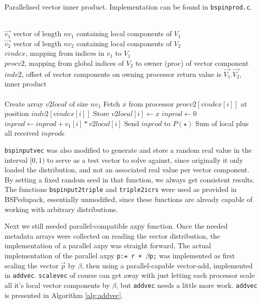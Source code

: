 \documentclass[a4paper]{article}
\newcommand{\ve}[1]{\ensuremath{\vec{#1}}}
\begin{document}
\begin{algorithm}
    \caption{Parallelised vector inner product. Implementation can be found in \texttt{bspinprod.c}.}
\label{alg:bspip}
\begin{algorithmic}
    \REQUIRE ~\\
             $\ve  {v_1}$ vector of length $nv_1$ containing local components of $V_1$\\
             $\ve  {v_2}$ vector of length $nv_2$ containing local components of $V_2$\\
             $vindex$, mapping from indices in $v_1$ to $V_1$\\
             $procv2$, mapping from global indices of $V_2$ to owner (proc) of vector component\\
             $indv2$, offset of vector components on owning processor
    \ENSURE  return value is $\ve{V_1}.\ve{V_2}$, inner product\\~\\
    \STATE Create array $v2local$ of size $nv_1$
    \STATE Fetch $x$ from processor $procv2[vindex[i]]$ at position $indv2[vindex[i]]$
    \STATE Store $v2local[i] \leftarrow x$
    \ENDFOR
    \STATE $inprod \leftarrow 0$
    \STATE $inprod \leftarrow inprod + v_1[i]*v2local[i]$
    \ENDFOR {}
    \STATE Send $inprod$ to $P(\star)$ 
    \RETURN Sum of local plus all received $inprod$s
\end{algorithmic}
\end{algorithm}

\texttt{bspinputvec} was also modified to generate and store a random real
value in the interval $[0,1)$ to serve as a test vector to solve against, since
    originally it only loaded the distribution, and not an associated real
    value per vector component. By setting a fixed random seed in that
    function, we always get consistent results. The functions
    \texttt{bspinput2triple} and \texttt{triple2icrs} were used as provided in
    BSPedupack, essentially unmodified, since these functions are already
    capable of working with arbitrary distributions.


Next we still needed parallel-compatible axpy function. Once the needed metadata arrays
were collected on reading the vector distribution, the implementation of a parallel axpy
was straight forward.
The actual implementation of the parallel axpy \texttt{p:= r + $\beta$p;} was implemented
as first scaling the vector \ve p by $\beta$, then using a parallel-capable vector-add,
implemented in \texttt{addvec}.
\texttt{scalevec} of course can get away with just letting each processor scale all it's local
vector components by $\beta$, but \texttt{addvec} needs a little more work. 
\texttt{addvec} is presented in Algorithm \ref{alg:addvec}.
\end{document}
